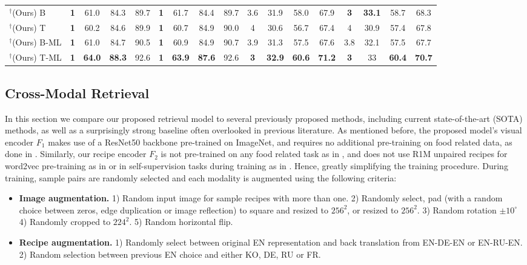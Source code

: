 \documentclass[sigconf,nonacm]{acmart}
\begin{document}
\begin{table*}[!ht]
\begin{tabular}{l|cccc|cccc|cccc|cccc}
	$^\dagger$(Ours) B & \textbf{1} & 61.0 & 84.3 & 89.7 & \textbf{1} & 61.7 & 84.4 & 89.7 & 3.6 & 31.9 & 58.0 & 67.9 & \textbf{3} & \textbf{33.1} & 58.7 & 68.3 \\ 
	$^\dagger$(Ours) T & \textbf{1} & 60.2 & 84.6 & 89.9 & \textbf{1} & 60.7 & 84.9 & 90.0 & 4 & 30.6 & 56.7 & 67.4 & 4 & 30.9 & 57.4 & 67.8 \\ 
	$^\dagger$(Ours) B-ML & \textbf{1} & 61.0 & 84.7 & 90.5 & \textbf{1} & 60.9 & 84.9 & 90.7 & 3.9 & 31.3 & 57.5 & 67.6 & 3.8 & 32.1 & 57.5 & 67.7 \\ 
	$^\dagger$(Ours) T-ML & \textbf{1} & \textbf{64.0} & \textbf{88.3} & 92.6 & \textbf{1} & \textbf{63.9} & \textbf{87.6} & 92.6 & \textbf{3} & \textbf{32.9} & \textbf{60.6} & \textbf{71.2} & \textbf{3} & 33 & \textbf{60.4} & \textbf{70.7} \\ 
	\bottomrule
     \end{tabular}

  \label{tab:xretrieval}\end{table*}





\subsection{Cross-Modal Retrieval}

In this section we compare our proposed retrieval model to several previously proposed methods, including current state-of-the-art (SOTA) methods, as well as a surprisingly strong baseline often overlooked in previous literature. As mentioned before, the proposed model's visual encoder $F_1$ makes use of a ResNet50 backbone pre-trained on ImageNet, and requires no additional pre-training on food related data, as done in \cite{Fain2019,chen2018}. Similarly, our recipe encoder $F_2$ is not pre-trained on any food related task as in \cite{Fain2019}, and does not use R1M unpaired recipes for word2vec pre-training as in \cite{salvador2017,carvalho2018,Zhu2019,wang2019} or in self-supervision tasks during training as in \cite{salvador2021}. Hence, greatly simplifying the training procedure. During training, sample pairs are randomly selected and each modality is augmented using the following criteria:
\begin{itemize}
    \item \textbf{Image augmentation.} 1) Random input image for sample recipes with more than one. 2) Randomly select, pad (with a random choice between zeros, edge duplication or image reflection) to square and resized to $256^2$, or resized to $256^2$. 3) Random rotation $\pm10^\circ$ 4) Randomly cropped to $224^2$. 5) Random horizontal flip.

    \item \textbf{Recipe augmentation.} 1) Randomly select between original EN representation and back translation from EN-DE-EN or EN-RU-EN. 2) Random selection between previous EN choice and either KO, DE, RU or FR.
\end{itemize}
\end{document}

